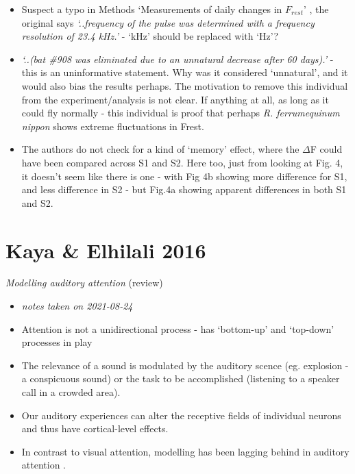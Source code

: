 \documentclass[
]{book}
\providecommand{\tightlist}{%
  \setlength{\itemsep}{0pt}\setlength{\parskip}{0pt}}
\begin{document}
\begin{itemize}
\tightlist
\item
  Suspect a typo in Methods `Measurements of daily changes in \(F_{rest}\)' , the original says \emph{`..frequency of the pulse was determined with a frequency resolution of 23.4 kHz.'} - `kHz' should be replaced with `Hz'?
\item
  \emph{`..(bat \#908 was eliminated due to an unnatural decrease after 60 days).'} - this is an uninformative statement. Why was it considered `unnatural', and it would also bias the results perhaps. The motivation to remove this individual from the experiment/analysis is not clear. If anything at all, as long as it could fly normally - this individual is proof that perhaps \emph{R. ferrumequinum nippon} shows extreme fluctuations in Frest.
\item
  The authors do not check for a kind of `memory' effect, where the \(\Delta\)F could have been compared across S1 and S2. Here too, just from looking at Fig. 4, it doesn't seem like there is one - with Fig 4b showing more difference for S1, and less difference in S2 - but Fig.4a showing apparent differences in both S1 and S2.
\end{itemize}

\hypertarget{kaya-elhilali-2016}{%
\chapter{Kaya \& Elhilali 2016}\label{kaya-elhilali-2016}}


\emph{Modelling auditory attention} (review) \citep{kaya2017modelling}

\begin{itemize}
\item
  \emph{notes taken on 2021-08-24}
\item
  Attention is not a unidirectional process - has `bottom-up' and `top-down' processes in play
\item
  The relevance of a sound is modulated by the auditory scence (eg. explosion - a conspicuous sound) or the task to be accomplished (listening to a speaker call in a crowded area).
\item
  Our auditory experiences can alter the receptive fields of individual neurons and thus have cortical-level effects.
\item
  In contrast to visual attention, modelling has been lagging behind in auditory attention .
\end{itemize}
\end{document}
